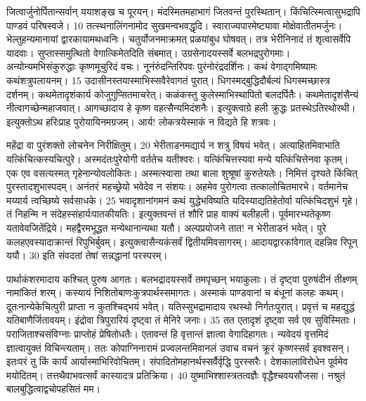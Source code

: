 जित्वार्जुनोर्पितान्सर्वान् ययाशङ्ख च पूरयन्।
 मंदस्मितमहाभागं जितवन्तं पुरस्थितान्।
 किंचित्स्मित्वासुभद्रापि पाण्डवं परिषस्वजे।
 10 तत्स्थनालिंगनामोद सुखमन्वभवद्धृदि।
 स्वाराज्यपारमेष्ट्यावा मोक्षेवातीतमर्जुनः।
 भेल्तुहन्यमानायां द्वारकायामथध्वनिः।
 चतुर्योजनमाक्रमत् प्रळयांबुध घोषवत्।
 तत्र भेरीनिनादं तं शृत्वासर्वेपि यादवाः।
 सुप्तास्समुत्थितो वेगात्किमेतदिति संबमात्।
 उग्रसेनादयस्सर्वे बलभद्रपुरोगमाः।
 अन्योन्यमभिसंकुरुद्धाः कृष्णमूचुरिदं वचः।
 नूनंरुंदन्तिरिपवः पुरंनोरंद्रदर्शिनः।
 कथं वेगाद्गमिष्यामः कथंशत्रुपलायनम्।
 15 उदासीनस्तयास्माभिस्सवैरेवागतं पुरात्।
 धिगस्मद्बुद्धिदौर्बल्यं धिगस्मच्छास्त्र दर्शनम्।
 कथमेतादृशंकार्य कोजुगुप्सितमाचरेत्।
 कळंकस्तु कुलेस्माभिस्थापितो बलदर्पितैः।
 कथमेतादृशंसैन्यं नीत्वागच्छेन्महाजवात्।
 आगच्छादाय हे कृष्ण वहत्सैन्यमिदंशनैः।
 इत्युक्त्वाग्रे हली क्रुद्धः प्रतस्थेऽतिरथोरथी।
 इत्युक्तोऽथ हरिःप्राह पुरोयायिनमग्रजम्।
 आर्य! लोकत्रयेस्माकं न विद्यते हि शत्रवः।
 
महेंद्रा वा पुरंशक्तो लोचनेन निरीक्षितुम्।
20 भेरीताडनमद्यार्य न शत्रु विषयं भवेत्।
 अत्याहितमिवाभाति यत्किंचित्कस्यचित्पुरे।
 अस्मदंतःपुरेयोगी वर्ततेच यतीश्वरः।
 यत्किंचित्तस्यवा मन्ये यत्किंचित्तेनवा कृतम्।
 एक एव वसत्यस्मत् गृहेनान्योवलोकितः।
 अस्मत्स्वासा तथा बाला शुश्रूषां कुरुतेयतेः।
 निमित्तं दृश्यते किंचित् पुरस्तादशुभास्पदम्।
 अनंतरं महच्छ्रेयो भवेदेव न संशयः।
 अहमेव पुरोगत्वा तत्कालोचितमारभे।
 वर्तमानेच मय्यार्य त्वच्छिष्ये सर्वसाधके।
 25 भवादृशानांगमनं कथं युद्धेभविष्यति यदिस्याद्यतिहेतोर्वा यत्किंचिदशुभं गृहे।
 तं निहन्मि न संदेहस्संहार्यःपातकीयतिः।
 इत्युक्तवन्तं तं शौरि प्राह वाक्यं बलीहली।
 पूर्वमारभ्यतेकृष्ण यतावेवजितेंद्रिये।
 महद्वैरमभूद्धत मन्येथानान्यथा यतौ।
 अल्पप्रयोजने तात! न भेरीताडनं भवेत्।
 पुरे कलहएवस्यादाक्रान्तं रिपुभिर्बुवम्।
 इत्युक्त्वासैन्यकंसर्वं द्वितीयमिवसागरम्।
 आदायद्वारकांवेगात् दहन्निव रिपून् ययौ।
 30 इति संवदतां तेषां सन्नद्धानां परस्परम्।
 
पार्थाकंशरमादाय कश्चित् पुरुष आगतः।
 बलभद्रादयस्सर्वे तमपृच्छन् भयाकुलाः।
 तं दृष्ट्वा पुरुषंदीनं तीक्ष्णम् नामांकितं शरम्।
 कस्यायं निशितोबाणःकुत्रपार्थस्समागतः।
 अस्माकं पाण्डवानां च बंधूनां कलहः कथम्।
 दूतःनान्येकेचित्पुरी प्राप्ता न कुतश्चिद्भयं भवेत्।
 यतिस्सुभद्रामादाय रथस्थो निर्गतःपुरात्।
 प्रवृत्तं च महद्युद्धं यतिबाणैर्जितावयम्।
 इंद्रोवा त्रिपुरारियं दृष्ट्वा तं मेनिरे जनाः।
 35 तत एतादृशं दृष्ट्वा सर्व एव सुविस्मिताः।
 पराजिताश्चसंविग्नाः प्राप्तोहं प्रेषितोधतैः।
 एतावन्तं हि वृत्तान्तं ज्ञात्वा वेगादिहागतः।
 न्यवेदयं वृत्तमिदं ज्ञात्वायुक्तं विचिन्त्यताम्।
 ततः कोपाग्निनारामं प्रज्वलन्तमिवानलं उवाच वचनं क्रूरं कृष्णस्सर्व इवश्वसन्।
 इतःपरं तु किं कार्यं आर्यास्माभिरिवोचितम्।
 संपादितोमहानर्थस्सर्वैर्वृद्धि पुरस्सरैः।
 देशकालाविरोधेन पूर्वमेव मयोदितम्।
 तत्तथैवाभवत्सर्वं कास्यादत्र प्रतिक्रिया।
 40 युष्माभिश्शास्त्रतत्वज्ञैः वृद्धैश्चवयसौजसा।
 नश्रुतं बालबुद्धित्वाद्वचोपहसितं मम।
 
